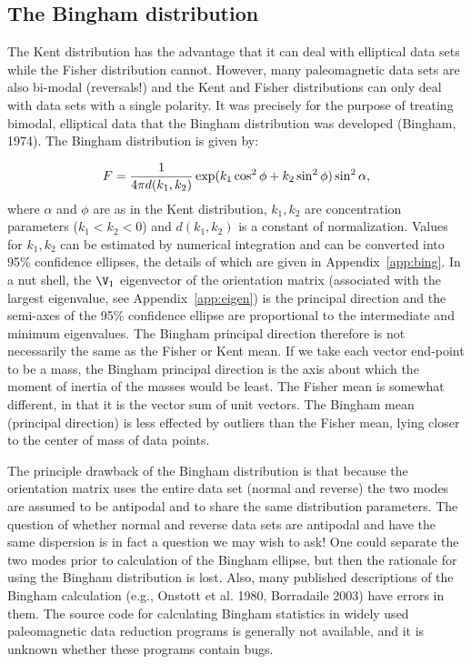     
 \subsection{The Bingham distribution}
 
 The Kent distribution has the advantage that it can deal with elliptical data sets while the Fisher distribution cannot.  However, many paleomagnetic data sets are also bi-modal (reversals!) and the Kent and Fisher distributions can only deal with data sets with a single polarity.    It was precisely for the purpose of treating bimodal, elliptical data that the 
 Bingham distribution was developed 
 (Bingham, 1974).    \nocite{bingham74}   The Bingham distribution is given by:
 
 $$
 F = {1\over {4\pi d(k_1,k_2)} } \exp( k_1\cos^2 \phi+k_2\sin^2\phi)\sin^2 \alpha,
 $$
 \noindent where $\alpha$ and $\phi$ are as in the Kent distribution,  $k_1,k_2$ are concentration parameters ($k_1<k_2<0$) and $d(k_1,k_2)$ is a constant of normalization. Values for $k_1,k_2$ can be estimated by numerical integration and can be converted into 95\% confidence ellipses, the details of which are  given in Appendix~\ref{app:bing}.   In a nut shell, the $\V_1$ eigenvector   of the orientation matrix (associated with the largest eigenvalue,  see Appendix~\ref{app:eigen}) is the principal direction and the semi-axes of the 95\% confidence ellipse  are proportional to the intermediate and minimum eigenvalues.  The Bingham principal direction therefore is not necessarily  the same as the Fisher or Kent  mean.  If we take each vector end-point to be a mass, the Bingham principal direction is the axis about which the moment of inertia of the masses would be least.  The Fisher mean is somewhat different, in that it is the vector sum of unit vectors.  The Bingham  mean (principal direction) is less effected by outliers than the Fisher mean, lying closer to the center of mass of data points.   
 
 The principle drawback of the Bingham distribution is that because the orientation matrix uses the entire data set (normal and reverse) the two modes are assumed to be antipodal and to share the same distribution parameters.  The question of whether normal and reverse data sets are antipodal and have the same dispersion is in fact a question we may wish to ask!    One could separate the two modes prior to calculation of the 
 Bingham ellipse, but then the rationale for using the Bingham distribution is lost.  Also, many published descriptions of the Bingham calculation (e.g., 
 Onstott et al. 1980, Borradaile  2003)  \nocite{onstott80,borradaile03}  have errors in them.   The source code for calculating Bingham statistics in widely used  paleomagnetic data reduction programs  is generally not available, and it is unknown whether these programs contain bugs.   
 
